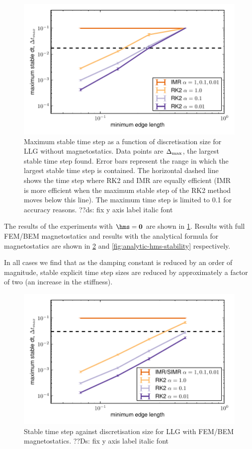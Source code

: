 \begin{figure}
  \centering
  \includegraphics[width=\textwidth]{images/stability_disabled}
  \caption{Maximum stable time step as a function of discretisation size for LLG without magnetostatics. Data points are $\Delta_{\mathrm{max}}$, the largest stable time step found. Error bars represent the range in which the largest stable time step is contained. The horizontal dashed line shows the time step where RK2 and IMR are equally efficient (IMR is more efficient when the maximum stable step of the RK2 method moves below this line). The maximum time step is limited to 0.1 for accuracy reasons.
??ds: fix y axis label italic font
}
  \label{fig:no-hms-stability}
\end{figure}


The results of the experiments with $\hms = \zerov$ are shown in \cref{fig:no-hms-stability}.
Results with full FEM/BEM magnetostatics and results with the analytical formula for magnetostatics are shown in \cref{fig:hms-stability} and \ref{fig:analytic-hms-stability} respectively.

In all cases we find that as the damping constant is reduced by an order of magnitude, stable explicit time step sizes are reduced by approximately a factor of two (\ie an increase in the stiffness).

\begin{figure}
  \centering
  \includegraphics[width=\textwidth]{images/stability_decoupled}
  \caption{Stable time step against discretisation size for LLG with FEM/BEM magnetostatics.
    ??Ds: fix y axis label italic font}
  \label{fig:hms-stability}
\end{figure}


